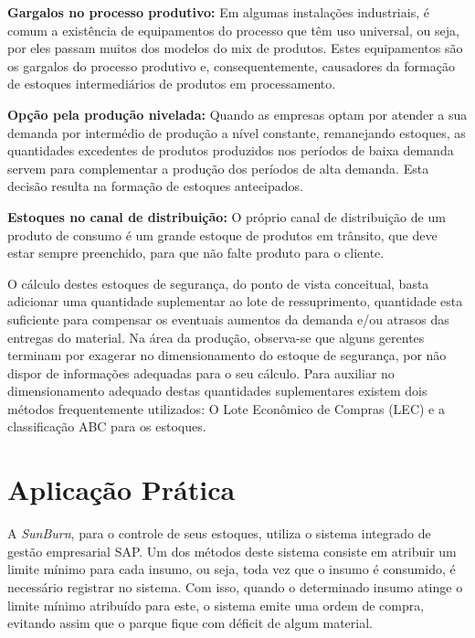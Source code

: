 \textbf{Gargalos no processo produtivo:} Em algumas instalações industriais, é comum a existência de equipamentos do processo que têm uso universal, ou seja, por eles passam muitos dos modelos do mix de produtos. Estes equipamentos são os gargalos do processo produtivo e, consequentemente, causadores da formação de estoques intermediários de produtos em processamento. 

\textbf{Opção pela produção nivelada:} Quando as empresas optam por atender a sua demanda por intermédio de produção a nível constante, remanejando estoques, as quantidades excedentes de produtos produzidos nos períodos de baixa demanda servem para complementar a produção dos períodos de alta demanda. Esta decisão resulta na formação de estoques antecipados.

\textbf{Estoques no canal de distribuição:} O próprio canal de distribuição de um produto de consumo é um grande estoque de produtos em trânsito, que deve estar sempre preenchido, para que não falte produto para o cliente.


O cálculo destes estoques de segurança, do ponto de vista conceitual, basta adicionar uma quantidade suplementar ao lote de ressuprimento, quantidade esta suficiente para compensar os eventuais aumentos da demanda e/ou atrasos das entregas do material. Na área da produção, observa-se que alguns gerentes terminam por exagerar no dimensionamento do estoque de segurança, por não dispor de informações adequadas para o seu cálculo. Para auxiliar no dimensionamento adequado destas quantidades suplementares existem dois métodos frequentemente utilizados: O Lote Econômico de Compras (LEC) e a classificação ABC para os estoques.

\section{Aplicação Prática}
\label{sec:controle_estoques_aplicacao}
A \textit{SunBurn}, para o controle de seus estoques, utiliza o sistema integrado de gestão empresarial \ac{SAP}. Um dos métodos deste sistema consiste em atribuir um limite mínimo para cada insumo, ou seja, toda vez que o insumo é consumido, é necessário registrar no sistema. Com isso, quando o determinado insumo atinge o limite mínimo atribuído para este, o sistema emite uma ordem de compra, evitando assim que o parque fique com déficit de algum material.

  

